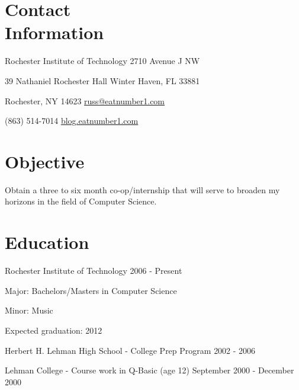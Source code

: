 \documentclass[a4paper,margin,line]{resume}
\begin{document}
\begin{resume}

\section{\mysidestyle Contact \\ Information}\vspace{2mm}
	\begin{asparablank}
		\item Rochester Institute of Technology \hfill 2710 Avenue J NW
		\item 39 Nathaniel Rochester Hall \hfill Winter Haven, FL 33881
		\item Rochester, NY 14623 \hfill \href{mailto:russ@eatnumber1.com}{russ@eatnumber1.com}
		\item (863) 514-7014 \hfill
		\href{http://blog.eatnumber1.com}{blog.eatnumber1.com}
	\end{asparablank}

\section{\mysidestyle Objective}
	Obtain a three to six month co-op/internship that will serve to broaden my
	horizons in the field of Computer Science.

\section{\mysidestyle Education}
	\begin{compactdesc}
		\item[Rochester Institute of Technology] \hfill {\footnotesize 2006 - Present}
		\begin{compactitem}
			\item {\small Major: Bachelors/Masters in Computer Science}
			\item {\small Minor: Music}
			\item {\small Expected graduation: 2012}
		\end{compactitem}
		\item[Herbert H. Lehman High School] - College Prep Program \hfill
		{\footnotesize 2002 - 2006}
		\item[Lehman College] - Course work in Q-Basic (age 12) \hfill
		{\footnotesize September 2000 - December 2000}
	\end{compactdesc}


\end{resume}
\end{document}
